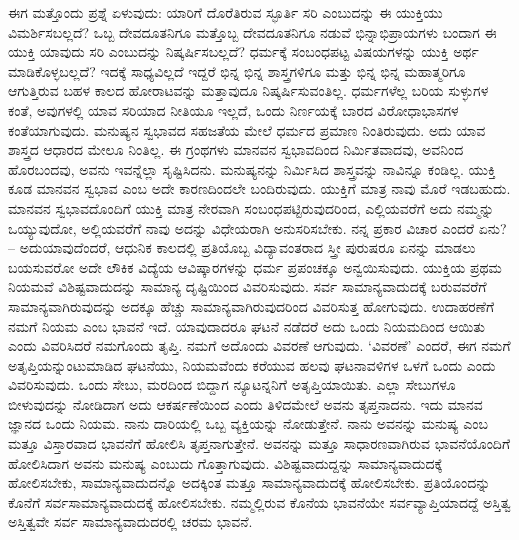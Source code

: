 ಈಗ ಮತ್ತೊಂದು ಪ್ರಶ್ನೆ ಏಳುವುದು: ಯಾರಿಗೆ ದೊರೆತಿರುವ ಸ್ಫೂರ್ತಿ ಸರಿ ಎಂಬುದನ್ನು ಈ ಯುಕ್ತಿಯು ವಿಮರ್ಶಿಸಬಲ್ಲದೆ? ಒಬ್ಬ ದೇವದೂತನಿಗೂ ಮತ್ತೊಬ್ಬ ದೇವದೂತನಿಗೂ ನಡುವೆ ಭಿನ್ನಾಭಿಪ್ರಾಯಗಳು ಬಂದಾಗ ಈ ಯುಕ್ತಿ ಯಾವುದು ಸರಿ ಎಂಬುದನ್ನು ನಿಷ್ಕರ್ಷಿಸಬಲ್ಲದೆ? ಧರ್ಮಕ್ಕೆ ಸಂಬಂಧಪಟ್ಟ ವಿಷಯಗಳನ್ನು ಯುಕ್ತಿ ಅರ್ಥ ಮಾಡಿಕೊಳ್ಳಬಲ್ಲದೆ? ಇದಕ್ಕೆ ಸಾಧ್ಯವಿಲ್ಲದೆ ಇದ್ದರೆ ಭಿನ್ನ ಭಿನ್ನ ಶಾಸ್ತ್ರಗಳಿಗೂ ಮತ್ತು ಭಿನ್ನ ಭಿನ್ನ ಮಹಾತ್ಮರಿಗೂ ಆಗುತ್ತಿರುವ ಬಹಳ ಕಾಲದ ಹೋರಾಟವನ್ನು ಮತ್ತಾವುದೂ ನಿಷ್ಕರ್ಷಿಸುವಂತಿಲ್ಲ. ಧರ್ಮಗಳೆಲ್ಲ ಬರಿಯ ಸುಳ್ಳುಗಳ ಕಂತೆ, ಅವುಗಳಲ್ಲಿ ಯಾವ ಸರಿಯಾದ ನೀತಿಯೂ ಇಲ್ಲದೆ, ಒಂದು ನಿರ್ಣಯಕ್ಕೆ ಬಾರದ ವಿರೋಧಾಭಾಸಗಳ ಕಂತೆಯಾಗುವುದು. ಮನುಷ್ಯನ ಸ್ವಭಾವದ ಸಹಜತೆಯ ಮೇಲೆ ಧರ್ಮದ ಪ್ರಮಾಣ ನಿಂತಿರುವುದು. ಅದು ಯಾವ ಶಾಸ್ತ್ರದ ಆಧಾರದ ಮೇಲೂ ನಿಂತಿಲ್ಲ. ಈ ಗ್ರಂಥಗಳು ಮಾನವನ ಸ್ವಭಾವದಿಂದ ನಿರ್ಮಿತವಾದವು, ಅವನಿಂದ ಹೊರಬಂದವು, ಅವನು ಇವನ್ನೆಲ್ಲಾ ಸೃಷ್ಟಿಸಿದನು. ಮನುಷ್ಯನನ್ನು ನಿರ್ಮಿಸಿದ ಶಾಸ್ತ್ರವನ್ನು ನಾವಿನ್ನೂ ಕಂಡಿಲ್ಲ. ಯುಕ್ತಿ ಕೂಡ ಮಾನವನ ಸ್ವಭಾವ ಎಂಬ ಅದೇ ಕಾರಣದಿಂದಲೇ ಬಂದಿರುವುದು. ಯುಕ್ತಿಗೆ ಮಾತ್ರ ನಾವು ಮೊರೆ ಇಡಬಹುದು. ಮಾನವನ ಸ್ವಭಾವದೊಂದಿಗೆ ಯುಕ್ತಿ ಮಾತ್ರ ನೇರವಾಗಿ ಸಂಬಂಧಪಟ್ಟಿರುವುದರಿಂದ, ಎಲ್ಲಿಯವರೆಗೆ ಅದು ನಮ್ಮನ್ನು ಒಯ್ಯುವುದೋ, ಅಲ್ಲಿಯವರೆಗೆ ನಾವು ಅದನ್ನು ವಿಧೇಯರಾಗಿ ಅನುಸರಿಸಬೇಕು. ನನ್ನ ಪ್ರಕಾರ ವಿಚಾರ ಎಂದರೆ ಏನು? – ಅದು\break ಯಾವುದೆಂದರೆ, ಆಧುನಿಕ ಕಾಲದಲ್ಲಿ ಪ್ರತಿಯೊಬ್ಬ ವಿದ್ಯಾವಂತರಾದ ಸ್ತ್ರೀ ಪುರುಷರೂ ಏನನ್ನು ಮಾಡಲು ಬಯಸುವರೋ ಅದೇ ಲೌಕಿಕ ವಿದ್ಯೆಯ ಆವಿಷ್ಕಾರಗಳನ್ನು ಧರ್ಮ ಪ್ರಪಂಚಕ್ಕೂ ಅನ್ವಯಿಸುವುದು. ಯುಕ್ತಿಯ ಪ್ರಥಮ ನಿಯಮವೆ ವಿಶಿಷ್ಟವಾದುದನ್ನು  ಸಾಮಾನ್ಯ ದೃಷ್ಟಿಯಿಂದ  ವಿವರಿಸುವುದು. ಸರ್ವ ಸಾಮಾನ್ಯವಾದುದಕ್ಕೆ ಬರುವವರೆಗೆ ಸಾಮಾನ್ಯವಾಗಿರುವುದನ್ನು ಅದಕ್ಕೂ ಹೆಚ್ಚು ಸಾಮಾನ್ಯವಾಗಿರುವುದರಿಂದ ವಿವರಿಸುತ್ತ ಹೋಗುವುದು. ಉದಾಹರಣೆಗೆ ನಮಗೆ ನಿಯಮ ಎಂಬ ಭಾವನೆ ಇದೆ. ಯಾವುದಾದರೂ ಘಟನೆ ನಡೆದರೆ ಅದು ಒಂದು ನಿಯಮದಿಂದ ಆಯಿತು ಎಂದು ವಿವರಿಸಿದರೆ ನಮಗೊಂದು ತೃಪ್ತಿ. ನಮಗೆ ಅದೊಂದು ವಿವರಣೆ ಆಗುವುದು. `ವಿವರಣೆ' ಎಂದರೆ, ಈಗ ನಮಗೆ ಅತೃಪ್ತಿಯನ್ನುಂಟುಮಾಡಿದ ಘಟನೆಯು, ನಿಯಮವೆಂದು ಕರೆಯುವ ಹಲವು ಘಟನಾವಳಿಗಳ ಒಳಗೆ ಒಂದು ಎಂದು ವಿವರಿಸುವುದು. ಒಂದು ಸೇಬು, ಮರದಿಂದ ಬಿದ್ದಾಗ ನ್ಯೂಟನ್ನನಿಗೆ ಅತೃಪ್ತಿಯಾಯಿತು. ಎಲ್ಲಾ ಸೇಬುಗಳೂ ಬೀಳುವುದನ್ನು ನೋಡಿದಾಗ ಅದು ಆಕರ್ಷಣೆಯಿಂದ ಎಂದು ತಿಳಿದಮೇಲೆ ಅವನು ತೃಪ್ತನಾದನು. ಇದು ಮಾನವ ಜ್ಞಾನದ ಒಂದು ನಿಯಮ. ನಾನು ದಾರಿಯಲ್ಲಿ ಒಬ್ಬ ವ್ಯಕ್ತಿಯನ್ನು ನೋಡುತ್ತೇನೆ. ನಾನು ಅವನನ್ನು ಮನುಷ್ಯ ಎಂಬ ಮತ್ತೂ ವಿಸ್ತಾರವಾದ ಭಾವನೆಗೆ ಹೋಲಿಸಿ ತೃಪ್ತನಾಗುತ್ತೇನೆ. ಅವನನ್ನು ಮತ್ತೂ ಸಾಧಾರಣವಾಗಿರುವ ಭಾವನೆಯೊಂದಿಗೆ ಹೋಲಿಸಿದಾಗ ಅವನು ಮನುಷ್ಯ ಎಂಬುದು ಗೊತ್ತಾಗುವುದು. ವಿಶಿಷ್ಟವಾದುದ್ದನ್ನು ಸಾಮಾನ್ಯವಾದುದಕ್ಕೆ ಹೋಲಿಸಬೇಕು, ಸಾಮಾನ್ಯವಾದುದನ್ನೊ ಅದಕ್ಕಿಂತ ಮತ್ತೂ ಸಾಮಾನ್ಯವಾದುದಕ್ಕೆ ಹೋಲಿಸಬೇಕು. ಪ್ರತಿಯೊಂದನ್ನು ಕೊನೆಗೆ ಸರ್ವಸಾಮಾನ್ಯವಾದುದಕ್ಕೆ ಹೋಲಿಸಬೇಕು. ನಮ್ಮಲ್ಲಿರುವ ಕೊನೆಯ ಭಾವನೆಯೇ  ಸರ್ವವ್ಯಾಪ್ತಿಯಾದದ್ದೆ ಅಸ್ತಿತ್ವ\break {} ಅಸ್ತಿತ್ವವೇ ಸರ್ವ ಸಾಮಾನ್ಯವಾದುದರಲ್ಲಿ ಚರಮ ಭಾವನೆ.

